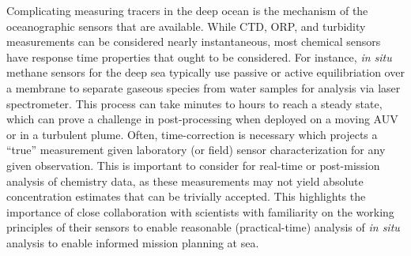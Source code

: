Complicating measuring tracers in the deep ocean is the mechanism of the oceanographic sensors that are available. While CTD, ORP, and turbidity measurements can be considered nearly instantaneous, most chemical sensors have response time properties that ought to be considered. For instance, \emph{in situ} methane sensors for the deep sea typically use passive or active equilibriation over a membrane to separate gaseous species from water samples for analysis via laser spectrometer. This process can take minutes to hours to reach a steady state, which can prove a challenge in post-processing when deployed on a moving AUV or in a turbulent plume. Often, time-correction is necessary \autocite{bittig2018oxygen} which projects a ``true'' measurement given laboratory (or field) sensor characterization for any given observation. This is important to consider for real-time or post-mission analysis of chemistry data, as these measurements may not yield absolute concentration estimates that can be trivially accepted. This highlights the importance of close collaboration with scientists with familiarity on the working principles of their sensors to enable reasonable (practical-time) analysis of \emph{in situ} analysis to enable informed mission planning at sea. 



